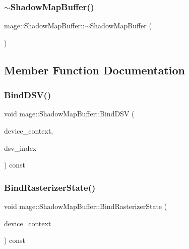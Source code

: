 \subsubsection{\texorpdfstring{$\sim$\+Shadow\+Map\+Buffer()}{~ShadowMapBuffer()}}
{\footnotesize\ttfamily mage\+::\+Shadow\+Map\+Buffer\+::$\sim$\+Shadow\+Map\+Buffer (\begin{DoxyParamCaption}{ }\end{DoxyParamCaption})\hspace{0.3cm}{\ttfamily [default]}}



\subsection{Member Function Documentation}
\hypertarget{structmage_1_1_shadow_map_buffer_a8e23dccfa670bdb4a698977b7524434e}{}\label{structmage_1_1_shadow_map_buffer_a8e23dccfa670bdb4a698977b7524434e} 
\subsubsection{\texorpdfstring{Bind\+D\+S\+V()}{BindDSV()}}
{\footnotesize\ttfamily void mage\+::\+Shadow\+Map\+Buffer\+::\+Bind\+D\+SV (\begin{DoxyParamCaption}\item[{I\+D3\+D11\+Device\+Context4 $\ast$}]{device\+\_\+context,  }\item[{size\+\_\+t}]{dsv\+\_\+index }\end{DoxyParamCaption}) const\hspace{0.3cm}{\ttfamily [noexcept]}}

\hypertarget{structmage_1_1_shadow_map_buffer_a4f71a1a486049ab2455af83f6a4c0f28}{}\label{structmage_1_1_shadow_map_buffer_a4f71a1a486049ab2455af83f6a4c0f28} 
\subsubsection{\texorpdfstring{Bind\+Rasterizer\+State()}{BindRasterizerState()}}
{\footnotesize\ttfamily void mage\+::\+Shadow\+Map\+Buffer\+::\+Bind\+Rasterizer\+State (\begin{DoxyParamCaption}\item[{I\+D3\+D11\+Device\+Context4 $\ast$}]{device\+\_\+context }\end{DoxyParamCaption}) const\hspace{0.3cm}{\ttfamily [noexcept]}}

